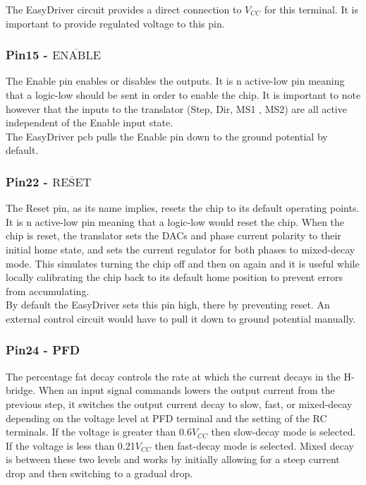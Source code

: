 \documentclass{article}
\theoremstyle{plain}
\theoremstyle{definition}
\theoremstyle{remark}
\begin{document}
The EasyDriver circuit provides a direct connection to $V_{CC}$ for this terminal. It is important to provide regulated voltage to this pin.

\subsubsection*{Pin15 - $\overline{\text{ENABLE}}$}
The Enable pin enables or disables the outputs. It is n active-low pin meaning that a logic-low should be sent in order to enable the chip. It is important to note however that the inputs to the translator (Step, Dir, MS1 , MS2) are all active independent of the Enable input state.\\

The EasyDriver pcb pulls the Enable pin down to the ground potential by default.



\subsubsection*{Pin22 - $\overline{\text{RESET}}$}
The Reset pin, as its name implies, resets the chip to its default operating points. It is n active-low pin meaning that a logic-low would reset the chip. When the chip is reset, the translator sets the DACs and phase current polarity to their initial home state, and sets the current regulator for both phases to mixed-decay mode. This simulates turning the chip off and then on again and it is useful while locally calibrating the chip back to its default home position to prevent errors from accumulating.\\

By default the EasyDriver sets this pin high, there by preventing reset. An external control circuit would have to pull it down to ground potential manually.

\subsubsection*{Pin24 - PFD}
The percentage fat decay controls the rate at which the current decays in the H-bridge. When an input signal commands lowers the output current from the previous step, it switches the output current decay to slow, fast, or mixed-decay depending on the voltage level at PFD terminal and the setting of the RC terminals. If the voltage is greater than 0.6$V_{CC}$ then slow-decay mode is selected.  If the voltage is less than 0.21$V_{CC}$ then fast-decay mode is selected.  Mixed decay is between these two levels and works by initially allowing for a steep current drop and then switching to a gradual drop.\\
\end{document}
